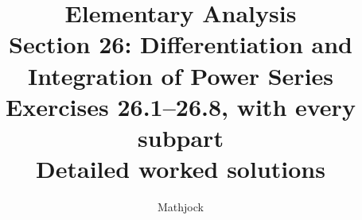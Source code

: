
\title{\textbf{Elementary Analysis}\\[0.3em]
Section 26: Differentiation and Integration of Power Series\\[0.4em]
\large Exercises 26.1--26.8, with every subpart\\
Detailed worked solutions}
\author{Mathjock}
\date{}

\maketitle
\bookinfo
\tableofcontents
\clearpage
\setcounter{section}{25}


